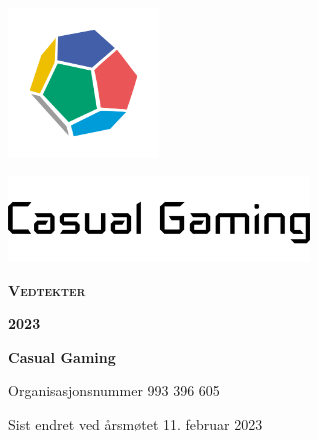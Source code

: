 \begin{titlepage}
    \centering
    \vspace*{1cm}
    \includegraphics[width=4cm]{innhold/logo-terning.png}\par
    \includegraphics[width=8cm]{innhold/logo-tekst.png}\par
    \vspace*{4cm}
    {\rmfamily\Huge\bfseries\scshape Vedtekter}\par
    \vspace*{0.5cm}
    {\rmfamily\LARGE\bfseries\scshape 2023}\par
    \vfill
    {\bfseries Casual Gaming}\par
    \vspace*{0.5cm}
    {Organisasjonsnummer 993 396 605}\par
    \vspace*{0.5cm}
    {Sist endret ved årsmøtet 11. februar 2023}\par
\end{titlepage}

